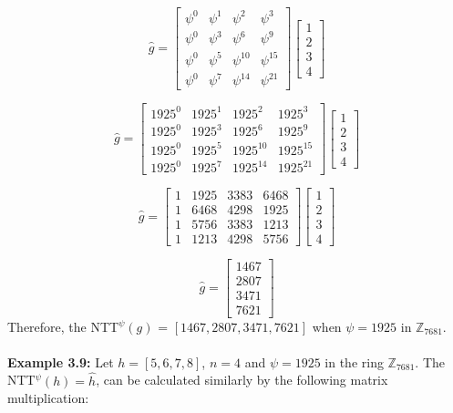 \documentclass[12pt]{report}
\begin{document}
\[\hat{g}=\begin{bmatrix}\psi^{0}&\psi^{1}&\psi^{2}&\psi^{3}\\ \psi^{0}&\psi^{3}&\psi^{6}&\psi^{9}\\ \psi^{0}&\psi^{5}&\psi^{10}&\psi^{15}\\ \psi^{0}&\psi^{7}&\psi^{14}&\psi^{21}\end{bmatrix}\begin{bmatrix}1\\ 2\\ 3\\ 4\end{bmatrix}\]

\[\hat{g}=\begin{bmatrix}1925^{0}&1925^{1}&1925^{2}&1925^{3}\\ 1925^{0}&1925^{3}&1925^{6}&1925^{9}\\ 1925^{0}&1925^{5}&1925^{10}&1925^{15}\\ 1925^{0}&1925^{7}&1925^{14}&1925^{21}\end{bmatrix}\begin{bmatrix}1\\ 2\\ 3\\ 4\end{bmatrix}\]

\[\hat{g}=\begin{bmatrix}1&1925&3383&6468\\ 1&6468&4298&1925\\ 1&5756&3383&1213\\ 1&1213&4298&5756\end{bmatrix}\begin{bmatrix}1\\ 2\\ 3\\ 4\end{bmatrix}\]

\[\hat{g}=\begin{bmatrix}1467\\ 2807\\ 3471\\ 7621\end{bmatrix}\]
Therefore, the NTT$^{\psi}(g)$ = $[1467,2807,3471,7621]$ when $\psi=1925$ in $\mathbb{Z}_{7681}$. \\ \\
\textbf{Example 3.9:} Let $h=[5,6,7,8]$, $n=4$ and $\psi=1925$ in the ring $\mathbb{Z}_{7681}$. The NTT$^{\psi}(h) = \hat{h}$, can be calculated similarly by the following matrix multiplication:
\end{document}
